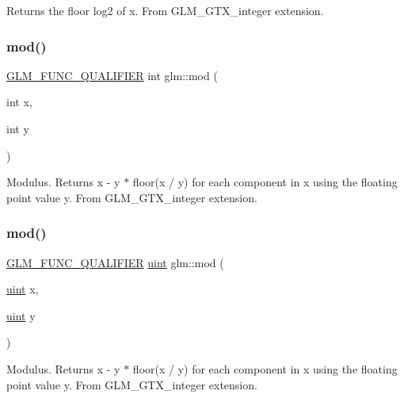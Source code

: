 Returns the floor log2 of x. From G\+L\+M\+\_\+\+G\+T\+X\+\_\+integer extension. \mbox{\label{group__gtx__integer_gab9d22df91aac4d9eb925a4910f556f1b}} 
\subsubsection{\texorpdfstring{mod()}{mod()}\hspace{0.1cm}{\footnotesize\ttfamily [1/2]}}
{\footnotesize\ttfamily \mbox{\hyperlink{setup_8hpp_a33fdea6f91c5f834105f7415e2a64407}{G\+L\+M\+\_\+\+F\+U\+N\+C\+\_\+\+Q\+U\+A\+L\+I\+F\+I\+ER}} int glm\+::mod (\begin{DoxyParamCaption}\item[{int}]{x,  }\item[{int}]{y }\end{DoxyParamCaption})}

Modulus. Returns x -\/ y $\ast$ floor(x / y) for each component in x using the floating point value y. From G\+L\+M\+\_\+\+G\+T\+X\+\_\+integer extension. \mbox{\label{group__gtx__integer_gab8f9ec0ca93ca90669434224818f0750}} 
\subsubsection{\texorpdfstring{mod()}{mod()}\hspace{0.1cm}{\footnotesize\ttfamily [2/2]}}
{\footnotesize\ttfamily \mbox{\hyperlink{setup_8hpp_a33fdea6f91c5f834105f7415e2a64407}{G\+L\+M\+\_\+\+F\+U\+N\+C\+\_\+\+Q\+U\+A\+L\+I\+F\+I\+ER}} \mbox{\hyperlink{group__core__precision_ga4fd29415871152bfb5abd588334147c8}{uint}} glm\+::mod (\begin{DoxyParamCaption}\item[{\mbox{\hyperlink{group__core__precision_ga4fd29415871152bfb5abd588334147c8}{uint}}}]{x,  }\item[{\mbox{\hyperlink{group__core__precision_ga4fd29415871152bfb5abd588334147c8}{uint}}}]{y }\end{DoxyParamCaption})}

Modulus. Returns x -\/ y $\ast$ floor(x / y) for each component in x using the floating point value y. From G\+L\+M\+\_\+\+G\+T\+X\+\_\+integer extension. \mbox{\label{group__gtx__integer_gacbe62fd2384464c16ea30ecc4defc11c}} 
